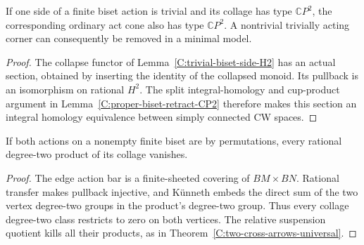 \begin{corollary}
\label{C:trivial-biset-side-CP2-retract}
If one side of a finite biset action is trivial and its collage
has type $\mathbb CP^2$, the corresponding ordinary act cone
also has type $\mathbb CP^2$.  A nontrivial trivially acting
corner can consequently be removed in a minimal model.
\end{corollary}
\begin{proof}
The collapse functor of Lemma~\ref{C:trivial-biset-side-H2}
has an actual section, obtained by inserting the identity of
the collapsed monoid.  Its pullback is an isomorphism on
rational $H^2$.  The split integral-homology and cup-product
argument in Lemma~\ref{C:proper-biset-retract-CP2} therefore
makes this section an integral homology equivalence between
simply connected CW spaces.
\end{proof}

\begin{lemma}
\label{C:permutation-biset-cups}
If both actions on a nonempty finite biset are by permutations,
every rational degree-two product of its collage vanishes.
\end{lemma}
\begin{proof}
The edge action bar is a finite-sheeted covering of
$BM\times BN$.  Rational transfer makes pullback injective,
and K\"unneth embeds the direct sum of the two vertex
degree-two groups in the product's degree-two group.
Thus every collage degree-two class restricts to zero on
both vertices.  The relative suspension quotient kills all
their products, as in Theorem~\ref{C:two-cross-arrows-universal}.
\end{proof}
